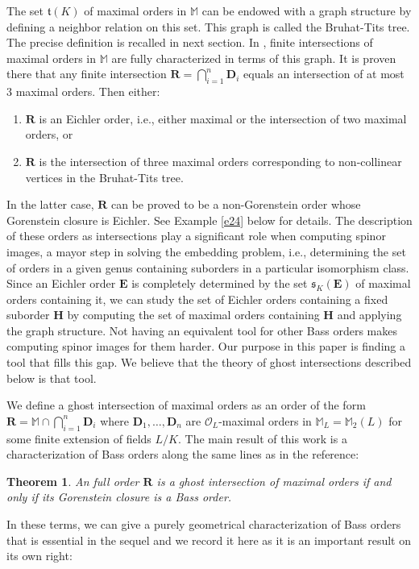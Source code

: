 \documentclass{amsart}
\newtheorem{theorem}{Theorem}[section] %
\theoremstyle{definition}
\newcommand\alge{\mathbb{M}}
\newcommand\oink{\mathcal O}
\newcommand\Ra{\mathbf R}
\newcommand\Da{\mathbf{D}}
\newcommand\Ha{\mathbf{H}}
\newcommand\Ea{\mathbf{E}}
\begin{document}
The set $\mathfrak{t}(K)$ of maximal orders in $\alge$
can be endowed with a graph structure by defining 
a neighbor relation on this set. This graph is called the
Bruhat-Tits tree. The precise definition is recalled in next 
section. In \cite{Tu}, finite intersections of maximal orders in
$\alge$ are fully characterized in terms of this graph. 
It is proven there
that any finite intersection $\Ra=\bigcap_{i=1}^n\Da_i$ 
equals an intersection of 
at most 3 maximal orders. Then either:
\begin{enumerate}
    \item $\Ra$ is an Eichler order, i.e.,
    either maximal or the intersection of two 
    maximal orders, or
    \item $\Ra$ is the intersection of three maximal orders
    corresponding to non-collinear vertices in the Bruhat-Tits
    tree.
\end{enumerate}
 In the latter case, $\Ra$ can be proved to be a 
 non-Gorenstein order whose
 Gorenstein closure is Eichler. 
 See Example \ref{e24} below
 for details. The description of these orders as intersections
 play a significant role when computing spinor images, 
 a mayor step in solving the embedding problem, i.e.,
 determining the set of orders in a given genus
 containing suborders in a particular isomorphism class.
 Since an Eichler order $\Ea$ is completely determined by the
set $\mathfrak{s}_K(\Ea)$ of maximal orders containing it, 
we can study the set of Eichler orders containing a fixed
suborder $\Ha$ by computing the set of maximal orders
containing $\Ha$ and applying the graph structure. 
 Not having an equivalent tool for other Bass orders
 makes computing spinor images for them harder.
Our purpose in this paper is finding a tool that fills
this gap. We believe that the theory of ghost intersections
described below is that tool.
 
 We define a ghost intersection of maximal orders as an 
order of the form $\Ra=\alge
\cap\bigcap_{i=1}^n\Da_i$ where
$\Da_1,\dots,\Da_n$ are $\oink_L$-maximal orders
in $\alge_L=\mathbb{M}_2(L)$ for some finite extension of fields $L/K$.
The main result of this work is a characterization of
Bass orders along the same lines as in the reference:
\begin{theorem}\label{t12}
An full order $\Ra$ is a ghost intersection 
of maximal orders if and
only if its Gorenstein closure is a Bass order.
\end{theorem}




In these terms, we can give a purely geometrical
characterization of Bass orders that is essential in the sequel
and we record it here as it is an important result on its 
own right:
\end{document}
